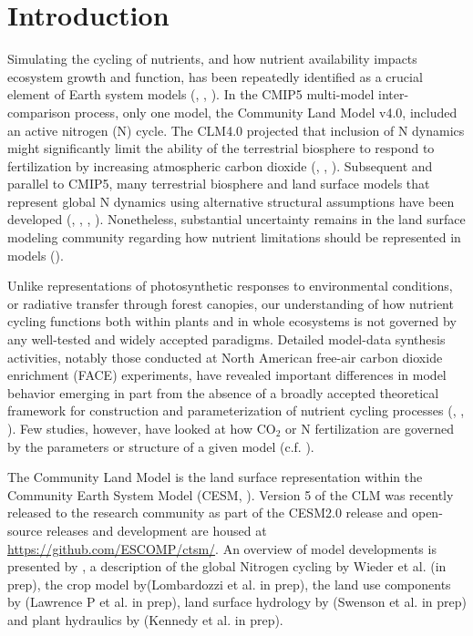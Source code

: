 \documentclass[draft,linenumbers]{agujournal}
\begin{document}
\section{Introduction}

Simulating the cycling of nutrients, and how nutrient availability impacts ecosystem growth and function, has been repeatedly identified as a crucial element of Earth system models (\cite{piao2013}, \cite{gruber2008}, \cite{wang2009}). In the CMIP5 multi-model inter-comparison process, only one model, the Community Land Model v4.0, included an active nitrogen (N) cycle. The CLM4.0 projected that inclusion of N dynamics might significantly limit the ability of the terrestrial biosphere to respond to fertilization by increasing atmospheric carbon dioxide (\cite{friedlingstein2006}, \cite{friedlingstein2014}, \cite{arora2013}). Subsequent and parallel to CMIP5, many terrestrial biosphere and land surface models that represent global N dynamics using alternative structural assumptions have been developed (\cite{wang2007}, \cite{zaehle2010}, \cite{goll2012}, \cite{smith2014}). Nonetheless, substantial uncertainty remains in the land surface modeling community regarding how nutrient limitations should be represented in models (\cite{zaehle2011}).


Unlike representations of photosynthetic responses to environmental conditions, or radiative transfer through forest canopies, our understanding of how nutrient cycling functions both within plants and in whole ecosystems is not governed by any well-tested and widely accepted paradigms. Detailed model-data synthesis activities, notably those conducted at North American free-air carbon dioxide enrichment (FACE) experiments, have revealed important differences in model behavior emerging in part from the absence of a broadly accepted theoretical framework for construction and parameterization of nutrient cycling processes (\cite{kauwe2013}, \cite{zaehle2014}, \cite{medlyn2015}). Few studies, however, have looked at how CO$_{2}$ or N fertilization are governed by the parameters or structure of a given model  (c.f. \cite{meyerholt2018}).


The Community Land Model is the land surface representation within the Community Earth System Model (CESM, \cite{hurrell2013}). Version 5 of the CLM was recently released to the research community as part of the CESM2.0 release and open-source releases and development are housed at \url{https://github.com/ESCOMP/ctsm/}. An overview of model developments is presented by \cite{lawrence2018}, a description of the global Nitrogen cycling by Wieder et al. (in prep), the crop model by(Lombardozzi et al. in prep), the land use components by (Lawrence P et al. in prep), land surface hydrology by (Swenson et al. in prep) and plant hydraulics by (Kennedy et al. in prep).
\end{document}
